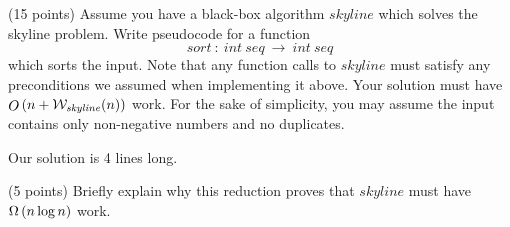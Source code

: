 \begin{task}[10]
(15 points)
Assume you have a black-box algorithm $\mathit{skyline}$ which solves the
skyline problem. Write pseudocode for a function
\[
  \mathit{sort}~:~int~seq~\to~int~seq
\]
which sorts the input. Note that any function calls to $\mathit{skyline}$ must
satisfy any preconditions we assumed when implementing it above.
Your solution must have $\mathop{O}\left(n + \mathcal{W}_\mathit{skyline}(n)\right)$ work.
For the sake of simplicity, you may assume the input contains only non-negative
numbers and no duplicates.
\end{task}
\begin{note}
Our solution is 4 lines long.
\end{note}

\begin{task}[11]
(5 points)
Briefly explain why this reduction proves that $\mathit{skyline}$ must have
$\Omega\left(n \log n\right)$ work.
\end{task}
